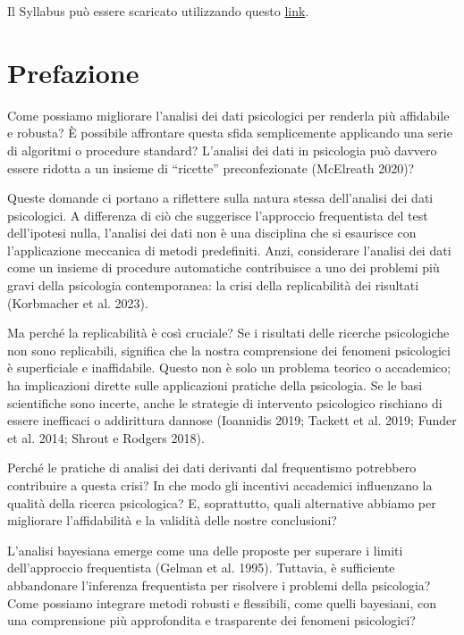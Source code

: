 \documentclass[
  letterpaper,
  krantz2]{{[}./krantz{]}}
\begin{document}
Il Syllabus può essere scaricato utilizzando questo
\href{syllabus/syllabus.pdf}{link}.

\mainmatter


\chapter*{Prefazione}\label{prefazione}


Come possiamo migliorare l'analisi dei dati psicologici per renderla più
affidabile e robusta? È possibile affrontare questa sfida semplicemente
applicando una serie di algoritmi o procedure standard? L'analisi dei
dati in psicologia può davvero essere ridotta a un insieme di
``ricette'' preconfezionate (McElreath 2020)?

Queste domande ci portano a riflettere sulla natura stessa dell'analisi
dei dati psicologici. A differenza di ciò che suggerisce l'approccio
frequentista del test dell'ipotesi nulla, l'analisi dei dati non è una
disciplina che si esaurisce con l'applicazione meccanica di metodi
predefiniti. Anzi, considerare l'analisi dei dati come un insieme di
procedure automatiche contribuisce a uno dei problemi più gravi della
psicologia contemporanea: la crisi della replicabilità dei risultati
(Korbmacher et al. 2023).

Ma perché la replicabilità è così cruciale? Se i risultati delle
ricerche psicologiche non sono replicabili, significa che la nostra
comprensione dei fenomeni psicologici è superficiale e inaffidabile.
Questo non è solo un problema teorico o accademico; ha implicazioni
dirette sulle applicazioni pratiche della psicologia. Se le basi
scientifiche sono incerte, anche le strategie di intervento psicologico
rischiano di essere inefficaci o addirittura dannose (Ioannidis 2019;
Tackett et al. 2019; Funder et al. 2014; Shrout e Rodgers 2018).

Perché le pratiche di analisi dei dati derivanti dal frequentismo
potrebbero contribuire a questa crisi? In che modo gli incentivi
accademici influenzano la qualità della ricerca psicologica? E,
soprattutto, quali alternative abbiamo per migliorare l'affidabilità e
la validità delle nostre conclusioni?

L'analisi bayesiana emerge come una delle proposte per superare i limiti
dell'approccio frequentista (Gelman et al. 1995). Tuttavia, è
sufficiente abbandonare l'inferenza frequentista per risolvere i
problemi della psicologia? Come possiamo integrare metodi robusti e
flessibili, come quelli bayesiani, con una comprensione più approfondita
e trasparente dei fenomeni psicologici?
\end{document}
